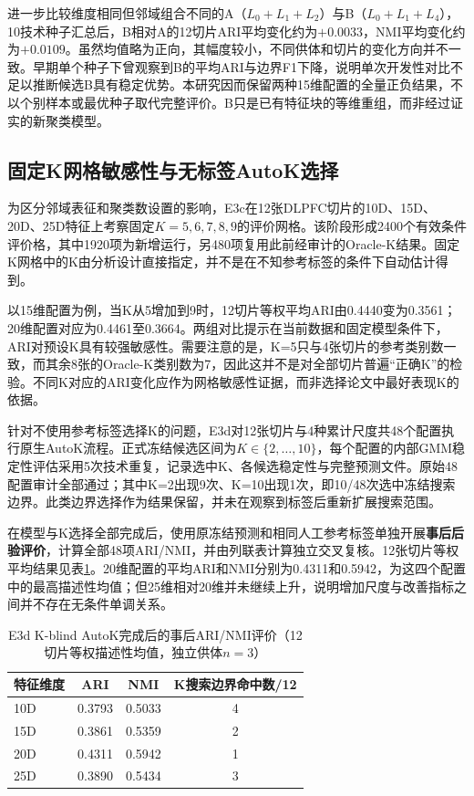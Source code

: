 进一步比较维度相同但邻域组合不同的A（$L_0+L_1+L_2$）与B（$L_0+L_1+L_4$），10技术种子汇总后，B相对A的12切片ARI平均变化约为$+0.0033$，NMI平均变化约为$+0.0109$。虽然均值略为正向，其幅度较小，不同供体和切片的变化方向并不一致。早期单个种子下曾观察到B的平均ARI与边界F1下降，说明单次开发性对比不足以推断候选B具有稳定优势。本研究因而保留两种15维配置的全量正负结果，不以个别样本或最优种子取代完整评价。B只是已有特征块的等维重组，而非经过证实的新聚类模型。

\subsection{固定K网格敏感性与无标签AutoK选择}
\label{subsec:cellcharter-e3c-e3d-v1}

为区分邻域表征和聚类数设置的影响，E3c在12张DLPFC切片的10D、15D、20D、25D特征上考察固定$K=5,6,7,8,9$的评价网格。该阶段形成2400个有效条件评价格，其中1920项为新增运行，另480项复用此前经审计的Oracle-K结果。固定K网格中的K由分析设计直接指定，并不是在不知参考标签的条件下自动估计得到。

以15维配置为例，当K从5增加到9时，12切片等权平均ARI由0.4440变为0.3561；20维配置对应为0.4461至0.3664。两组对比提示在当前数据和固定模型条件下，ARI对预设K具有较强敏感性。需要注意的是，K=5只与4张切片的参考类别数一致，而其余8张的Oracle-K类别数为7，因此这并不是对全部切片普遍“正确K”的检验。不同K对应的ARI变化应作为网格敏感性证据，而非选择论文中最好表现K的依据。

针对不使用参考标签选择K的问题，E3d对12张切片与4种累计尺度共48个配置执行原生AutoK流程。正式冻结候选区间为$K\in\{2,\ldots,10\}$，每个配置的内部GMM稳定性评估采用5次技术重复，记录选中K、各候选稳定性与完整预测文件。原始48配置审计全部通过；其中K=2出现9次、K=10出现1次，即10/48次选中冻结搜索边界。此类边界选择作为结果保留，并未在观察到标签后重新扩展搜索范围。

在模型与K选择全部完成后，使用原冻结预测和相同人工参考标签单独开展\textbf{事后后验评价}，计算全部48项ARI/NMI，并由列联表计算独立交叉复核。12张切片等权平均结果见表\ref{tab:cellcharter-e3d-v1}。20维配置的平均ARI和NMI分别为0.4311和0.5942，为这四个配置中的最高描述性均值；但25维相对20维并未继续上升，说明增加尺度与改善指标之间并不存在无条件单调关系。

\begin{table}[htbp]
\centering
\caption{E3d K-blind AutoK完成后的事后ARI/NMI评价（12切片等权描述性均值，独立供体$n=3$）}
\label{tab:cellcharter-e3d-v1}
\begin{tabular}{lccc}
\toprule
特征维度 & ARI & NMI & K搜索边界命中数/12\\
\midrule
10D & 0.3793 & 0.5033 & 4\\
15D & 0.3861 & 0.5359 & 2\\
20D & 0.4311 & 0.5942 & 1\\
25D & 0.3890 & 0.5434 & 3\\
\bottomrule
\end{tabular}
\end{table}

